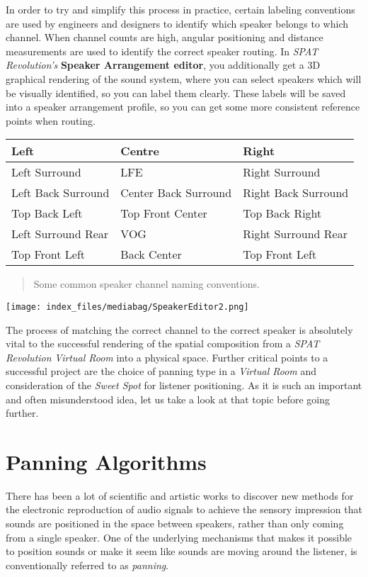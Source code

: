 \documentclass[
  letterpaper,
  DIV=11,
  numbers=noendperiod]{scrreport}
\begin{document}
In order to try and simplify this process in practice, certain labeling
conventions are used by engineers and designers to identify which
speaker belongs to which channel. When channel counts are high, angular
positioning and distance measurements are used to identify the correct
speaker routing. In \emph{SPAT Revolution's} \textbf{Speaker Arrangement
editor}, you additionally get a 3D graphical rendering of the sound
system, where you can select speakers which will be visually identified,
so you can label them clearly. These labels will be saved into a speaker
arrangement profile, so you can get some more consistent reference
points when routing.

\begin{longtable}[]{@{}lll@{}}
\toprule()
Left & Centre & Right \\
\midrule()
\endhead
Left Surround & LFE & Right Surround \\
Left Back Surround & Center Back Surround & Right Back Surround \\
Top Back Left & Top Front Center & Top Back Right \\
Left Surround Rear & VOG & Right Surround Rear \\
Top Front Left & Back Center & Top Front Left \\
\bottomrule()
\end{longtable}

\begin{quote}
Some common speaker channel naming conventions.
\end{quote}

\texttt{[image: index\_files/mediabag/SpeakerEditor2.png]}

The process of matching the correct channel to the correct speaker is
absolutely vital to the successful rendering of the spatial composition
from a \emph{SPAT Revolution} \emph{Virtual Room} into a physical space.
Further critical points to a successful project are the choice of
panning type in a \emph{Virtual Room} and consideration of the
\emph{Sweet Spot} for listener positioning. As it is such an important
and often misunderstood idea, let us take a look at that topic before
going further.

\hypertarget{panning-algorithms}{%
\chapter{Panning Algorithms}\label{panning-algorithms}}

There has been a lot of scientific and artistic works to discover new
methods for the electronic reproduction of audio signals to achieve the
sensory impression that sounds are positioned in the space between
speakers, rather than only coming from a single speaker. One of the
underlying mechanisms that makes it possible to position sounds or make
it seem like sounds are moving around the listener, is conventionally
referred to as \emph{panning}.
\end{document}
